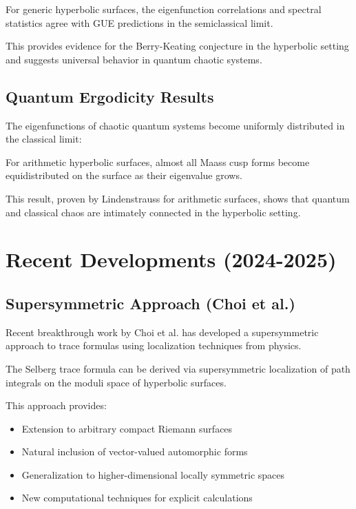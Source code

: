 \begin{theorem}
\label{thm:quantum_ergodicity}
For generic hyperbolic surfaces, the eigenfunction correlations and spectral statistics agree with GUE predictions in the semiclassical limit.
\end{theorem}

This provides evidence for the Berry-Keating conjecture in the hyperbolic setting and suggests universal behavior in quantum chaotic systems.

\subsection{Quantum Ergodicity Results}

The eigenfunctions of chaotic quantum systems become uniformly distributed in the classical limit:

\begin{theorem}
\label{thm:quantum_unique_ergodicity}
For arithmetic hyperbolic surfaces, almost all Maass cusp forms become equidistributed on the surface as their eigenvalue grows.
\end{theorem}

This result, proven by Lindenstrauss for arithmetic surfaces, shows that quantum and classical chaos are intimately connected in the hyperbolic setting.

\section{Recent Developments (2024-2025)}
\label{sec:recent_developments}

\subsection{Supersymmetric Approach (Choi et al.)}

Recent breakthrough work by Choi et al. has developed a supersymmetric approach to trace formulas using localization techniques from physics.

\begin{theorem}
\label{thm:supersymmetric_trace}
The Selberg trace formula can be derived via supersymmetric localization of path integrals on the moduli space of hyperbolic surfaces.
\end{theorem}

This approach provides:
\begin{itemize}
\item Extension to arbitrary compact Riemann surfaces
\item Natural inclusion of vector-valued automorphic forms
\item Generalization to higher-dimensional locally symmetric spaces
\item New computational techniques for explicit calculations
\end{itemize}

